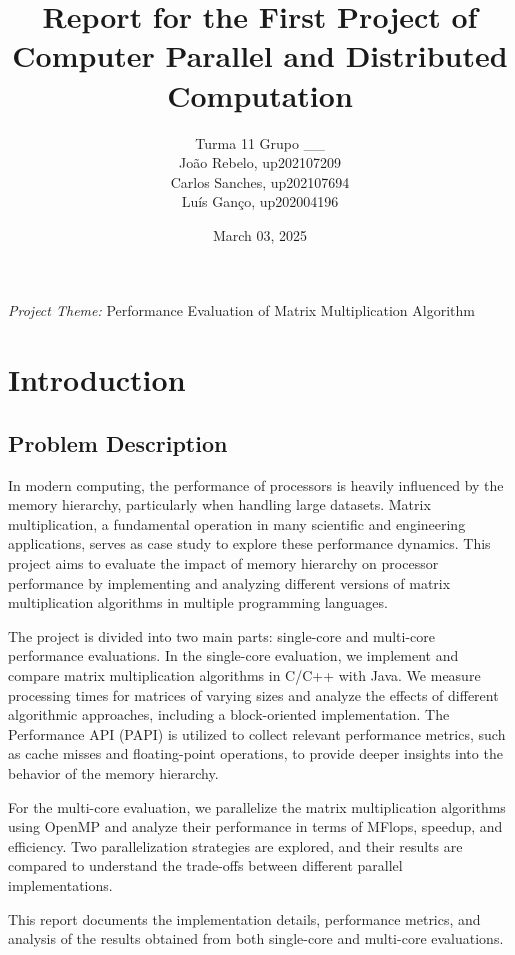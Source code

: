 \documentclass{article}
\title{Report for the First Project of Computer Parallel and Distributed Computation }
\author{
Turma 11 Grupo \_\_ \\
João Rebelo, up202107209 \\
Carlos Sanches, up202107694 \\
Luís Ganço, up202004196
}
\date{March 03, 2025}
\begin{document}
\newpage 

\maketitle
\begin{center}
    \large \textit{Project Theme:} Performance Evaluation of Matrix Multiplication Algorithm
\end{center}
\newpage
\tableofcontents
\newpage %

\section{Introduction}

\subsection{Problem Description}
In modern computing, the performance of processors is heavily influenced by the memory hierarchy, particularly when handling large datasets. Matrix multiplication, a fundamental operation in many scientific and engineering applications, serves as case study to explore these performance dynamics. This project aims to evaluate the impact of memory hierarchy on processor performance by implementing and analyzing different versions of matrix multiplication algorithms in multiple programming languages.

The project is divided into two main parts: single-core and multi-core performance evaluations. In the single-core evaluation, we implement and compare matrix multiplication algorithms in C/C++ with Java. We measure processing times for matrices of varying sizes and analyze the effects of different algorithmic approaches, including a block-oriented implementation. The Performance API (PAPI) is utilized to collect relevant performance metrics, such as cache misses and floating-point operations, to provide deeper insights into the behavior of the memory hierarchy.

For the multi-core evaluation, we parallelize the matrix multiplication algorithms using OpenMP and analyze their performance in terms of MFlops, speedup, and efficiency. Two parallelization strategies are explored, and their results are compared to understand the trade-offs between different parallel implementations.

This report documents the implementation details, performance metrics, and analysis of the results obtained from both single-core and multi-core evaluations. 
\end{document}
